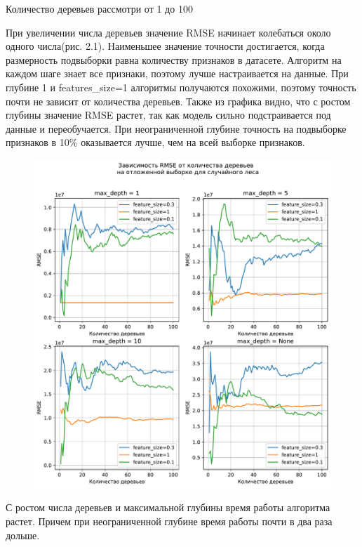 \documentclass[a4paper, 12pt]{report}
\begin{document}
Количество деревьев рассмотри от 1 до 100



При увеличении числа деревьев значение RMSE начинает колебаться около одного числа(рис. 2.1). Наименьшее значение точности достигается, когда размерность подвыборки равна количеству признаков в датасете. Алгоритм на каждом шаге знает все признаки, поэтому лучше настраивается на данные. При глубине 1 и features\_size=1 алгоритмы получаются похожими, поэтому точность почти не зависит от количества деревьев. Также из графика видно, что с ростом глубины значение RMSE растет, так как модель сильно подстраивается под данные и переобучается. При неограниченной глубине точность на подвыборке признаков в 10\% оказывается лучше, чем на всей выборке признаков.


\begin{figure}[H]
        	\centering
        	\includegraphics[width=0.7\linewidth]{ex1_1.pdf}
        	\label{fig:mpr}
        	\vspace{-25pt}
        	\caption{}


\end{figure}


С ростом числа деревьев и максимальной глубины время работы алгоритма растет. Причем при неограниченной глубине время работы почти в два раза дольше.
\end{document}
